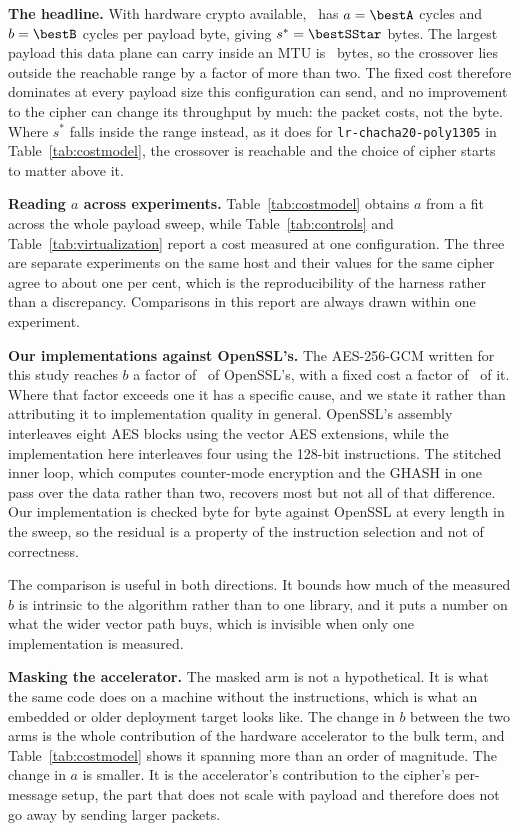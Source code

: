 \noindent\textbf{The headline.}
With hardware crypto available, \bestCipher\ has $a = \bestA$ cycles and
$b = \bestB$ cycles per payload byte, giving $s^{*} = \bestSStar$ bytes. The
largest payload this data plane can carry inside an MTU is \protoMaxPayload\
bytes, so the crossover lies outside the reachable range by a factor of more
than two. The fixed cost therefore dominates at every payload size this
configuration can send, and no improvement to the cipher can change its
throughput by much: the packet costs, not the byte. Where $s^{*}$ falls inside
the range instead, as it does for \texttt{lr-chacha20-poly1305} in
Table~\ref{tab:costmodel}, the crossover is reachable and the choice of cipher
starts to matter above it.

\noindent\textbf{Reading $a$ across experiments.}
Table~\ref{tab:costmodel} obtains $a$ from a fit across the whole payload sweep,
while Table~\ref{tab:controls} and Table~\ref{tab:virtualization} report a cost
measured at one configuration. The three are separate experiments on the same
host and their values for the same cipher agree to about one per cent, which is
the reproducibility of the harness rather than a discrepancy. Comparisons in
this report are always drawn within one experiment.

\noindent\textbf{Our implementations against OpenSSL's.}
The AES-256-GCM written for this study reaches $b$ a factor of \simdVsOpensslB\
of OpenSSL's, with a fixed cost a factor of \simdVsOpensslA\ of it. Where that
factor exceeds one it has a specific cause, and we state it rather than
attributing it to implementation quality in general. OpenSSL's assembly
interleaves eight AES blocks using the vector AES extensions, while the
implementation here interleaves four using the 128-bit instructions. The
stitched inner loop, which computes counter-mode encryption and the GHASH in one
pass over the data rather than two, recovers most but not all of that
difference. Our implementation is checked byte for byte against OpenSSL at every
length in the sweep, so the residual is a property of the instruction selection
and not of correctness.

The comparison is useful in both directions. It bounds how much of the measured
$b$ is intrinsic to the algorithm rather than to one library, and it puts a
number on what the wider vector path buys, which is invisible when only one
implementation is measured.

\noindent\textbf{Masking the accelerator.}
The masked arm is not a hypothetical. It is what the same code does on a machine
without the instructions, which is what an embedded or older deployment target
looks like. The change in $b$ between the two arms is the whole contribution of
the hardware accelerator to the bulk term, and Table~\ref{tab:costmodel} shows
it spanning more than an order of magnitude. The change in $a$ is smaller. It is
the accelerator's contribution to the cipher's per-message setup, the part that
does not scale with payload and therefore does not go away by sending larger
packets.
